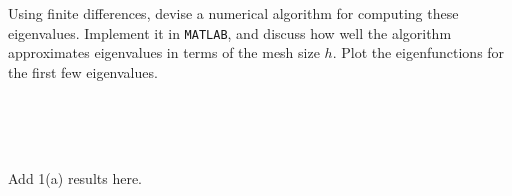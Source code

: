 Using finite differences, devise a numerical algorithm for computing these eigenvalues. Implement it in \texttt{MATLAB},
and discuss how well the algorithm approximates eigenvalues in terms of the mesh size $h$. Plot the eigenfunctions for 
the first few eigenvalues.

\begin{solution}\ \\\\
    \ \\
    \newpage

    Add 1(a) results here.
\end{solution}